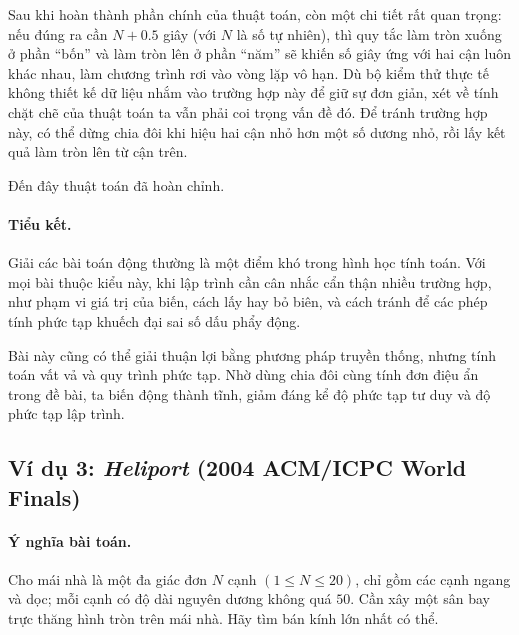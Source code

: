 \documentclass[11pt]{article}
\begin{document}
Sau khi hoàn thành phần chính của thuật toán, còn một chi tiết rất quan trọng:
nếu đúng ra cần \(N+0.5\) giây (với \(N\) là số tự nhiên), thì quy tắc làm
tròn xuống ở phần ``bốn'' và làm tròn lên ở phần ``năm'' sẽ khiến số giây ứng
với hai cận luôn khác nhau, làm chương trình rơi vào vòng lặp vô hạn. Dù bộ
kiểm thử thực tế không thiết kế dữ liệu nhắm vào trường hợp này để giữ sự đơn
giản, xét về tính chặt chẽ của thuật toán ta vẫn phải coi trọng vấn đề đó.
Để tránh trường hợp này, có thể dừng chia đôi khi hiệu hai cận nhỏ hơn một số
dương nhỏ, rồi lấy kết quả làm tròn lên từ cận trên.

Đến đây thuật toán đã hoàn chỉnh.

\paragraph{Tiểu kết.}
Giải các bài toán động thường là một điểm khó trong hình học tính toán. Với
mọi bài thuộc kiểu này, khi lập trình cần cân nhắc cẩn thận nhiều trường hợp,
như phạm vi giá trị của biến, cách lấy hay bỏ biên, và cách tránh để các phép
tính phức tạp khuếch đại sai số dấu phẩy động.

Bài này cũng có thể giải thuận lợi bằng phương pháp truyền thống, nhưng tính
toán vất vả và quy trình phức tạp. Nhờ dùng chia đôi cùng tính đơn điệu ẩn
trong đề bài, ta biến động thành tĩnh, giảm đáng kể độ phức tạp tư duy và độ
phức tạp lập trình.

\subsection{Ví dụ 3: \textit{Heliport} (2004 ACM/ICPC World Finals)}

\paragraph{Ý nghĩa bài toán.}
Cho mái nhà là một đa giác đơn \(N\) cạnh \((1\le N\le 20)\), chỉ gồm các
cạnh ngang và dọc; mỗi cạnh có độ dài nguyên dương không quá \(50\). Cần xây
một sân bay trực thăng hình tròn trên mái nhà. Hãy tìm bán kính lớn nhất có
thể.
\end{document}
